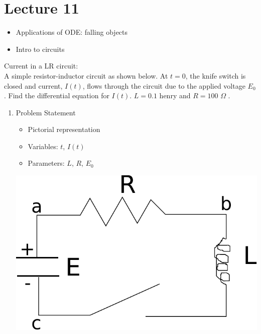 \chapter*{Lecture 11}
\begin{recall}{}{}
\begin{itemize}
\item Applications of ODE: falling objects
\item Intro to circuits
\end{itemize}
\end{recall}




\begin{exmp}{Current in a LR circuit:}\\
A simple resistor-inductor circuit as shown below. At $t=0$, the knife switch is closed and current, $I(t)$, flows through the circuit due to the applied voltage $E_0$. Find the differential equation for $I(t)$. $L=0.1$ henry and $R=100$ $\Omega$ .
\begin{enumerate}
\item {Problem Statement}\\
\begin{minipage}{0.6 \textwidth}
\begin{itemize}
\item Pictorial representation
\item Variables: $t$, $I(t)$
\item Parameters: $L$, $R$, $E_0$
\end{itemize}
\end{minipage}
\begin{minipage}{0.25 \textwidth}
\includegraphics[width=\textwidth]{figs/LRcircuit.pdf} 
\end{minipage}

\end{enumerate}
\end{exmp}
